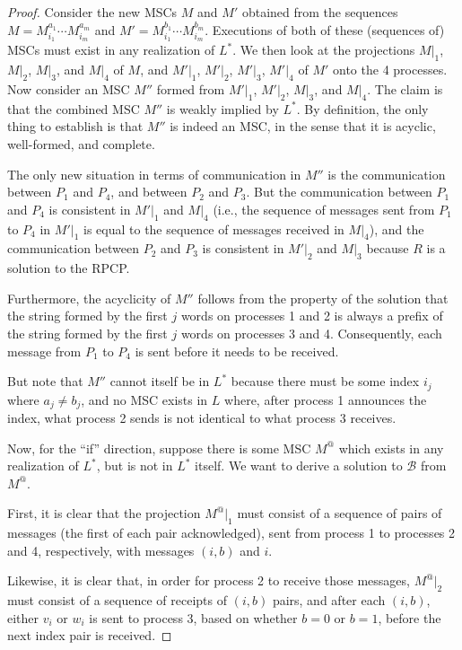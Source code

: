 \begin{proof}
Consider the new MSCs $M$ and $M'$ obtained from the sequences
$M = M^{a_1}_{i_1} \cdots M^{a_m}_{i_m}$ and $M' = M^{b_1}_{i_1} \cdots M^{b_m}_{i_m}$.
Executions of both of these (sequences of) MSCs must exist in any
realization of $L^*$. We then look at the projections $M|_1$, $M|_2$, $M|_3$,
and $M|_4$ of $M$, and $M'|_1$, $M'|_2$, $M'|_3$, $M'|_4$ of $M'$ onto the
4 processes. Now consider an MSC $M''$ formed from $M'|_1$, $M'|_2$,
$M|_3$, and $M|_4$. The claim is that the combined MSC $M''$ is weakly
implied by $L^*$. By definition, the only thing to establish is that $M''$
is indeed an MSC, in the sense that it is acyclic, well-formed, and complete. 


The only new situation in terms of communication in $M''$ is the
communication between $P_1$ and $P_4$, and between $P_2$ and $P_3$.
But the communication between $P_1$ and $P_4$ is consistent in
$M'|_1$ and $M|_4$ (i.e., the sequence of messages sent from $P_1$ to
$P_4$ in $M'|_1$ is equal to the sequence of messages received in $M|_4$),
and the communication between $P_2$ and $P_3$ is consistent in
$M'|_2$ and $M|_3$ because $R$ is a solution to the RPCP.

Furthermore, the acyclicity of $M''$ follows from the property of the
solution that the string formed by the first $j$ words on processes 1
and 2 is always a prefix of the string formed by the first $j$ words
on processes 3 and 4. Consequently, each message from $P_1$ to $P_4$
is sent before it needs to be received.

But note that $M''$ cannot itself be in $L^*$ because there must be
some index $i_j$ where $a_j \neq b_j$, and no MSC exists in $L$ where,
after process 1 announces the index, what process 2 sends is not
identical to what process 3 receives.

Now, for the “if” direction, suppose there is some MSC $M^@$ which
exists in any realization of $L^*$, but is not in $L^*$ itself. We want
to derive a solution to $\mathcal{B}$ from $M^@$.

First, it is clear that the projection $M^@|_1$ must consist of a sequence
of pairs of messages (the first of each pair acknowledged), sent from
process 1 to processes 2 and 4, respectively, with messages $(i, b)$ and $i$.

Likewise, it is clear that, in order for process 2 to receive those messages,
$M^@|_2$ must consist of a sequence of receipts of $(i, b)$ pairs, and after
each $(i, b)$, either $v_i$ or $w_i$ is sent to process 3, based on whether
$b = 0$ or $b = 1$, before the next index pair is received.


\end{proof}
